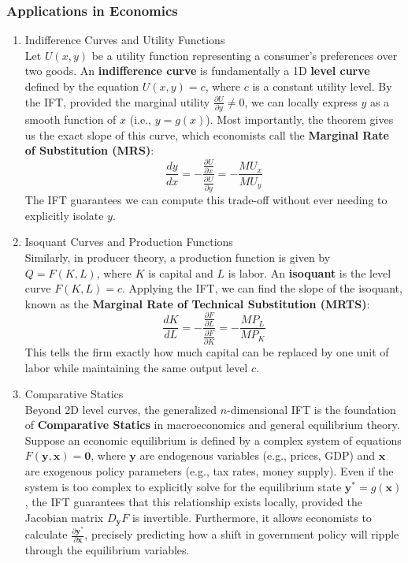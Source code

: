 \subsubsection*{Applications in Economics}
\begin{enumerate}
\item Indifference Curves and Utility Functions\\
Let $U(x, y)$ be a utility function representing a consumer's preferences over two goods. An \textbf{indifference curve} is fundamentally a 1D \textbf{level curve} defined by the equation $U(x, y) = c$, where $c$ is a constant utility level. 
By the IFT, provided the marginal utility $\frac{\partial U}{\partial y} \neq 0$, we can locally express $y$ as a smooth function of $x$ (i.e., $y = g(x)$). Most importantly, the theorem gives us the exact slope of this curve, which economists call the \textbf{Marginal Rate of Substitution (MRS)}:
$$ \frac{dy}{dx} = -\frac{\frac{\partial U}{\partial x}}{\frac{\partial U}{\partial y}} = -\frac{MU_x}{MU_y} $$
The IFT guarantees we can compute this trade-off without ever needing to explicitly isolate $y$.

\item Isoquant Curves and Production Functions\\
Similarly, in producer theory, a production function is given by $Q = F(K, L)$, where $K$ is capital and $L$ is labor. An \textbf{isoquant} is the level curve $F(K, L) = c$. 
Applying the IFT, we can find the slope of the isoquant, known as the \textbf{Marginal Rate of Technical Substitution (MRTS)}:
$$ \frac{dK}{dL} = -\frac{\frac{\partial F}{\partial L}}{\frac{\partial F}{\partial K}} = -\frac{MP_L}{MP_K} $$
This tells the firm exactly how much capital can be replaced by one unit of labor while maintaining the same output level $c$.

\item Comparative Statics\\
Beyond 2D level curves, the generalized $n$-dimensional IFT is the foundation of \textbf{Comparative Statics} in macroeconomics and general equilibrium theory. 
Suppose an economic equilibrium is defined by a complex system of equations $F(\mathbf{y}, \mathbf{x}) = \mathbf{0}$, where $\mathbf{y}$ are endogenous variables (e.g., prices, GDP) and $\mathbf{x}$ are exogenous policy parameters (e.g., tax rates, money supply). Even if the system is too complex to explicitly solve for the equilibrium state $\mathbf{y}^* = g(\mathbf{x})$, the IFT guarantees that this relationship exists locally, provided the Jacobian matrix $D_{\mathbf{y}}F$ is invertible. Furthermore, it allows economists to calculate $\frac{\partial \mathbf{y}^*}{\partial \mathbf{x}}$, precisely predicting how a shift in government policy will ripple through the equilibrium variables.
\end{enumerate}